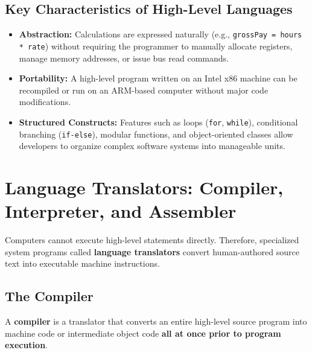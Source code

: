 \subsection{Key Characteristics of High-Level Languages}
\begin{itemize}[leftmargin=1.2em]
    \item \textbf{Abstraction:} Calculations are expressed naturally (e.g., \texttt{grossPay = hours * rate}) without requiring the programmer to manually allocate registers, manage memory addresses, or issue bus read commands.
    \item \textbf{Portability:} A high-level program written on an Intel x86 machine can be recompiled or run on an ARM-based computer without major code modifications.
    \item \textbf{Structured Constructs:} Features such as loops (\texttt{for}, \texttt{while}), conditional branching (\texttt{if-else}), modular functions, and object-oriented classes allow developers to organize complex software systems into manageable units.
\end{itemize}

\section{Language Translators: Compiler, Interpreter, and Assembler}

Computers cannot execute high-level statements directly. Therefore, specialized system programs called \textbf{language translators} convert human-authored source text into executable machine instructions.

\subsection{The Compiler}
A \textbf{compiler} is a translator that converts an entire high-level source program into machine code or intermediate object code \textbf{all at once prior to program execution}.


